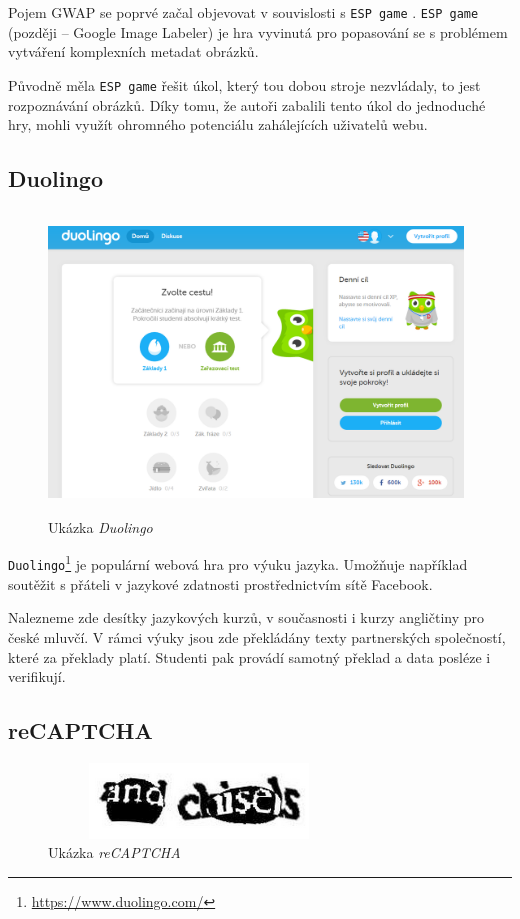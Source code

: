 Pojem GWAP se poprvé začal objevovat v souvislosti s \verb|ESP game| \cite{ahn_2004}. \verb|ESP game| (později  -- Google Image Labeler) je hra vyvinutá pro popasování se s problémem vytváření komplexních metadat obrázků.

Původně měla \verb|ESP game| řešit úkol, který tou dobou stroje nezvládaly, to jest rozpoznávání obrázků. Díky tomu, že autoři zabalili tento úkol do jednoduché hry, mohli využít ohromného potenciálu zahálejících uživatelů webu.

\subsection{Duolingo}

\begin{figure}[h]
	\centering
	\includegraphics[width=110mm,height=80mm]{img/duolingo.png}
	\caption{Ukázka {\sl Duolingo}}
	\label{fig:duolingo}
\end{figure}

\verb|Duolingo|\footnote{\url{https://www.duolingo.com/}} je populární webová hra pro výuku jazyka. Umožňuje například soutěžit s přáteli v jazykové zdatnosti prostřednictvím sítě Facebook.

Nalezneme zde desítky jazykových kurzů, v současnosti i kurzy angličtiny pro české mluvčí. V rámci výuky jsou zde překládány texty partnerských společností, které za překlady platí. Studenti pak provádí samotný překlad a data posléze i verifikují.

\subsection{reCAPTCHA}

\begin{figure}[h]
	\centering
	\includegraphics[width=80mm,height=20mm]{img/recaptcha.png}
	\caption{Ukázka {\sl reCAPTCHA}}
	\label{fig:recaptcha}
\end{figure}

